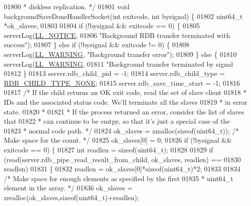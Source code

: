 \begin{DoxyCode}
{{{{{{{{{{{{{{{{{{{{{{{{{{{{{{{{{{{01800 \textcolor{comment}{ * diskless replication. */}
01801 \textcolor{keywordtype}{void} backgroundSaveDoneHandlerSocket(\textcolor{keywordtype}{int} exitcode, \textcolor{keywordtype}{int} bysignal) \{
01802     uint64\_t *ok\_slaves;
01803 
01804     \textcolor{keywordflow}{if} (!bysignal && exitcode == 0) \{
01805         serverLog(\hyperlink{server_8h_a8c54c191e436c7dd3012167212692401}{LL\_NOTICE},
01806             \textcolor{stringliteral}{"Background RDB transfer terminated with success"});
01807     \} \textcolor{keywordflow}{else} \textcolor{keywordflow}{if} (!bysignal && exitcode != 0) \{
01808         serverLog(\hyperlink{server_8h_a31229b9334bba7d6be2a72970967a14b}{LL\_WARNING}, \textcolor{stringliteral}{"Background transfer error"});
01809     \} \textcolor{keywordflow}{else} \{
01810         serverLog(\hyperlink{server_8h_a31229b9334bba7d6be2a72970967a14b}{LL\_WARNING},
01811             \textcolor{stringliteral}{"Background transfer terminated by signal %
01812     \}
01813     server.rdb\_child\_pid = -1;
01814     server.rdb\_child\_type = \hyperlink{server_8h_acfd6e0670ac08e8f4c13f33c8a2c6b5e}{RDB\_CHILD\_TYPE\_NONE};
01815     server.rdb\_save\_time\_start = -1;
01816 
01817     \textcolor{comment}{/* If the child returns an OK exit code, read the set of slave client}
01818 \textcolor{comment}{     * IDs and the associated status code. We'll terminate all the slaves}
01819 \textcolor{comment}{     * in error state.}
01820 \textcolor{comment}{     *}
01821 \textcolor{comment}{     * If the process returned an error, consider the list of slaves that}
01822 \textcolor{comment}{     * can continue to be emtpy, so that it's just a special case of the}
01823 \textcolor{comment}{     * normal code path. */}
01824     ok\_slaves = zmalloc(\textcolor{keyword}{sizeof}(uint64\_t)); \textcolor{comment}{/* Make space for the count. */}
01825     ok\_slaves[0] = 0;
01826     \textcolor{keywordflow}{if} (!bysignal && exitcode == 0) \{
01827         \textcolor{keywordtype}{int} readlen = \textcolor{keyword}{sizeof}(uint64\_t);
01828 
01829         \textcolor{keywordflow}{if} (read(server.rdb\_pipe\_read\_result\_from\_child, ok\_slaves, readlen) ==
01830                  readlen)
01831         \{
01832             readlen = ok\_slaves[0]*\textcolor{keyword}{sizeof}(uint64\_t)*2;
01833 
01834             \textcolor{comment}{/* Make space for enough elements as specified by the first}
01835 \textcolor{comment}{             * uint64\_t element in the array. */}
01836             ok\_slaves = zrealloc(ok\_slaves,\textcolor{keyword}{sizeof}(uint64\_t)+readlen);
}}}}}}}}}}}}}}}}}}}}}}}}}}}}}}}}}}}}
\end{DoxyCode}
